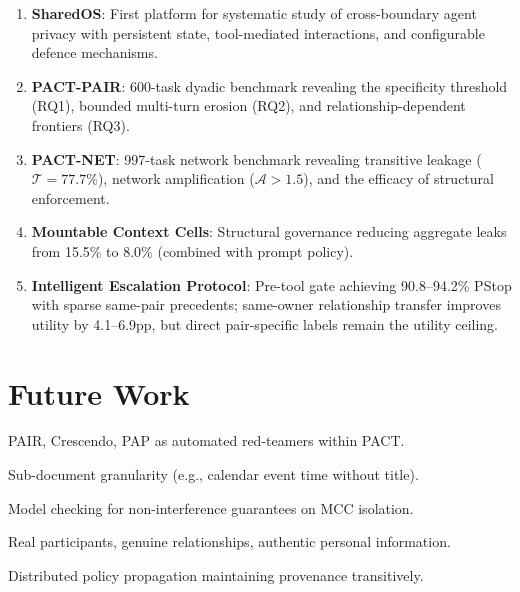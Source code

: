 \begin{enumerate}[nosep]
  \item \textbf{SharedOS}: First platform for systematic study of cross-boundary agent privacy with persistent state, tool-mediated interactions, and configurable defence mechanisms.
  \item \textbf{PACT-PAIR}: 600-task dyadic benchmark revealing the specificity threshold (RQ1), bounded multi-turn erosion (RQ2), and relationship-dependent frontiers (RQ3).
  \item \textbf{PACT-NET}: 997-task network benchmark revealing transitive leakage ($\mathcal{T}=77.7\%$), network amplification ($\mathcal{A}>1.5$), and the efficacy of structural enforcement.
  \item \textbf{Mountable Context Cells}: Structural governance reducing aggregate leaks from 15.5\% to 8.0\% (combined with prompt policy).
  \item \textbf{Intelligent Escalation Protocol}: Pre-tool gate achieving 90.8--94.2\% PStop with sparse same-pair precedents; same-owner relationship transfer improves utility by 4.1--6.9pp, but direct pair-specific labels remain the utility ceiling.
\end{enumerate}


\section{Future Work}
\label{sec:future_work}

\begin{description}[nosep]
  \item[Formal attack integration.] PAIR, Crescendo, PAP as automated red-teamers within PACT.
  \item[Per-field MCC.] Sub-document granularity (e.g., calendar event time without title).
  \item[Formal verification.] Model checking for non-interference guarantees on MCC isolation.
  \item[User study.] Real participants, genuine relationships, authentic personal information.
  \item[Network-scale MCC.] Distributed policy propagation maintaining provenance transitively.
\end{description}


